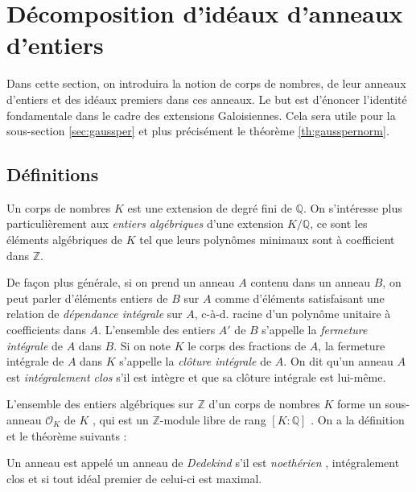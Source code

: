 \documentclass[a4paper]{article} %
\numberwithin{section}{part}
\numberwithin{equation}{section}
\newcommand\QQ{\mathbb{Q}}
\newcommand\ZZ{\mathbb{Z}}
\newcommand\EO{\mathcal{O}}
\begin{document}
\section{Décomposition d'idéaux d'anneaux d'entiers}
Dans cette section, on introduira la notion de corps de nombres, de leur
anneaux d'entiers et des idéaux premiers dans ces anneaux. Le but est d'énoncer 
l'identité fondamentale dans le cadre des extensions Galoisiennes. Cela sera 
utile pour la sous-section \ref{sec:gaussper} et plus précisément le 
théorème \ref{th:gausspernorm}.

\subsection{Définitions}
Un corps de nombres $K$ est une extension de degré fini de $\QQ$. On s'intéresse
plus particulièrement aux \emph{entiers algébriques} d'une extension $K/\QQ$, ce
sont les éléments algébriques de $K$ tel que leurs polynômes minimaux sont à
coefficient dans $\ZZ$.\par 
De façon plus générale, si on prend un anneau $A$ contenu dans un anneau $B$, on
peut parler d'éléments entiers de $B$ sur $A$ comme d'éléments satisfaisant une 
relation de \emph{dépendance intégrale} sur $A$, c-à-d. racine d'un 
polynôme unitaire à coefficients dans $A$. L'ensemble des entiers $A'$ de $B$ 
s'appelle la \emph{fermeture intégrale} de $A$ dans $B$. Si on note $K$ le corps
des fractions de $A$, la fermeture intégrale de $A$ dans $K$ s'appelle la 
\emph{clôture intégrale} de $A$. On dit qu'un anneau $A$ est \emph{intégralement
clos} s'il est intègre et que sa clôture intégrale est lui-même.\par
L'ensemble des entiers algébriques sur $\ZZ$ d'un corps de nombres $K$ forme un
sous-anneau $\EO_K$ de $K$ \cite[p.~35, cor. 2]{Sam}, qui est un $\ZZ$-module 
libre de rang $[K:\QQ]$ \cite[p.~48, cor.]{Sam}. On a la définition et le 
théorème suivants :
\begin{defn}
Un anneau est appelé un anneau de \emph{Dedekind} s'il est \emph{noethérien} 
\cite[p.~55, déf. 1]{Sam}, intégralement clos et si tout idéal premier 
de celui-ci est maximal.
\end{defn}
\end{document}
